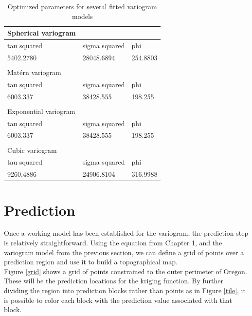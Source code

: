 \documentclass[12pt,twoside]{reedthesis}
\begin{document}
\begin{table}[h!]

\centering

\begin{tabular}{l|l|l}

\hline
 Spherical variogram &&\\
\hline
tau squared  &  sigma squared     &   phi \\
\hline
 5402.2780 & 28048.6894  & 254.8803 \\
 \hline \\
 \hline
 Mat\'ern variogram&& \\
\hline
 tau squared  & sigma squared   &    phi \\
 \hline
 6003.337 & 38428.555  & 198.255 \\
 \hline \\
 \hline
 Exponential variogram & &\\
\hline
 tau squared  & sigma squared   &    phi \\
 \hline
 6003.337 & 38428.555  & 198.255 \\
 \hline \\
 \hline
Cubic variogram & &\\
\hline
 tau squared &   sigma squared    &    phi \\
 \hline
 9260.4886 & 24906.8104  & 316.9988 \\
 \hline
 
 \end{tabular}
 
 \caption{Optimized parameters for several fitted variogram models}
 \label{param}
 
 \end{table}
 
 \section{Prediction}
 
 Once a working model has been established for the variogram, the prediction step is relatively straightforward. Using the equation from Chapter 1, and the variogram model from the previous section, we can define a grid of points over a prediction region and use it to build a topographical map. \\
 
 Figure \ref{grid} shows a grid of points constrained to the outer perimeter of Oregon. These will be the prediction locations for the kriging function. By further dividing the region into prediction blocks rather than points as in Figure \ref{tile}, it is possible to color each block with the prediction value associated with that block. 
 
\end{document}

